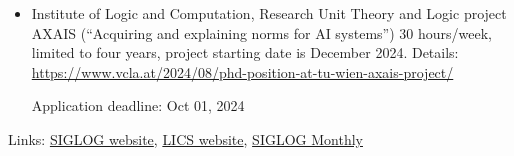 \documentclass[prodmode,acmtecs]{acmsmall} %
\begin{document}
\begin{itemize}\item  Institute of Logic and Computation, Research Unit Theory and Logic project AXAIS (“Acquiring and explaining norms for AI systems”) 30 hours/week, limited to four years, project starting date is December 2024. Details: \href{https://www.vcla.at/2024/08/phd-position-at-tu-wien-axais-project/}{https://www.vcla.at/2024/08/phd-position-at-tu-wien-axais-project/} 
 
Application deadline: Oct 01, 2024 
 
\end{itemize}


\bigskip Links: \href{http://siglog.org/}{SIGLOG website}, \href{https://lics.siglog.org}{LICS website}, \href{https://lics.siglog.org/newsletters/}{SIGLOG Monthly}
\end{document}
